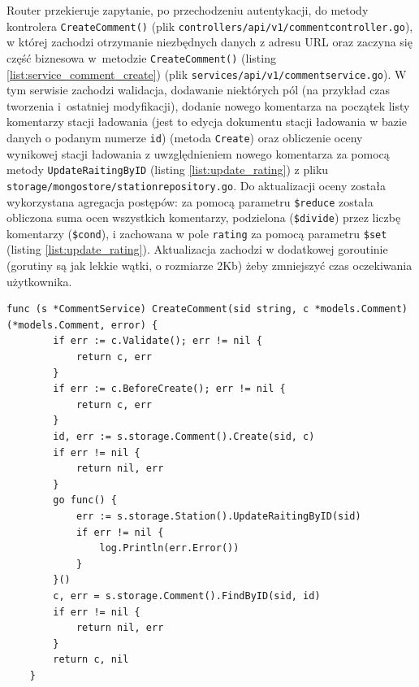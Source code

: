 Router przekieruje zapytanie, po przechodzeniu autentykacji, do metody kontrolera \texttt{CreateComment()} (plik \texttt{controllers/api/v1/commentcontroller.go}), w której zachodzi otrzymanie niezbędnych danych z adresu URL oraz zaczyna się część biznesowa w~metodzie \texttt{CreateComment()} (listing \ref{list:service_comment_create}) (plik \texttt{services/api/v1/commentservice.go}).
W tym serwisie zachodzi walidacja, dodawanie niektórych pól (na przykład czas tworzenia i~ostatniej modyfikacji), dodanie nowego komentarza na początek listy komentarzy stacji ładowania (jest to edycja dokumentu stacji ładowania w bazie danych o podanym numerze \texttt{id}) (metoda \texttt{Create}) oraz obliczenie oceny wynikowej stacji ładowania z uwzględnieniem nowego komentarza za pomocą metody \texttt{UpdateRaitingByID} (listing \ref{list:update_rating}) z pliku \texttt{storage/mongostore/stationrepository.go}.
Do aktualizacji oceny została wykorzystana agregacja postępów: za pomocą parametru \texttt{\$reduce} została obliczona suma ocen wszystkich komentarzy, podzielona (\texttt{\$divide}) przez liczbę komentarzy (\texttt{\$cond}), i zachowana w pole \texttt{rating} za pomocą parametru \texttt{\$set} (listing \ref{list:update_rating}). Aktualizacja zachodzi w dodatkowej goroutinie (gorutiny są jak lekkie wątki, o rozmiarze 2Kb) żeby zmniejszyć czas oczekiwania użytkownika.


\begin{lstlisting}[label=list:service_comment_create,caption=Serwis tworzenia komentarza.,basicstyle=\tiny\ttfamily]
    func (s *CommentService) CreateComment(sid string, c *models.Comment) (*models.Comment, error) {
        if err := c.Validate(); err != nil {
            return c, err
        }
        if err := c.BeforeCreate(); err != nil {
            return c, err
        }
        id, err := s.storage.Comment().Create(sid, c)
        if err != nil {
            return nil, err
        }
        go func() {
            err := s.storage.Station().UpdateRaitingByID(sid)
            if err != nil {
                log.Println(err.Error())
            }
        }()
        c, err = s.storage.Comment().FindByID(sid, id)
        if err != nil {
            return nil, err
        }
        return c, nil
    }
\end{lstlisting}
    
